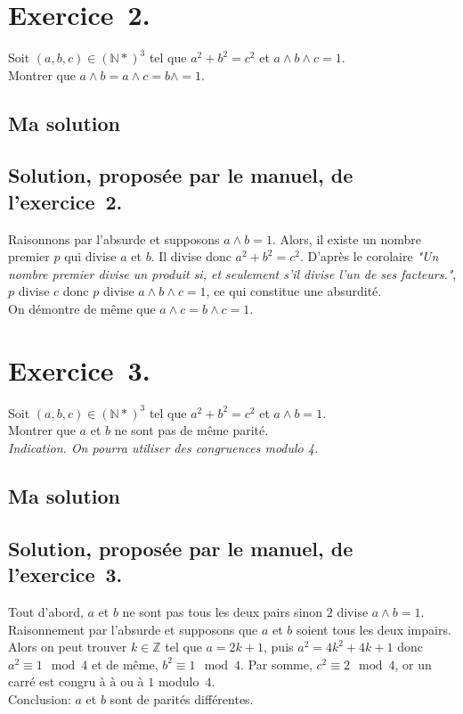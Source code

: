 \documentclass[a4paper,14pt]{extarticle} %
\def\eclaire{\mathbb}
\def\N{\ensuremath{\eclaire N}}
\def\Z{\ensuremath{\eclaire Z}}
\begin{document}
\section*{Exercice~2.}

Soit $(a,b,c) \in (\N*)^3$ tel que $a^2+b^2=c^2$ et $ a \wedge b \wedge c =1$.\\ Montrer que $a \wedge b = a \wedge c = b \wedge =1$.

\subsection*{Ma solution}

\subsection*{Solution, proposée par le manuel, de l'exercice~2.}
Raisonnons par l'absurde et supposons $ a \wedge b =1$. Alors, il existe un nombre premier $p$ qui divise $a$ et $b$. Il divise donc $a^2+b^2=c^2$. D'après le corolaire {\textsl{"Un nombre premier divise un produit si, et seulement s'il divise l'un de ses facteurs."}}, $p$ divise $c$ donc $p$ divise $ a \wedge b \wedge c =1$, ce qui constitue une absurdité.\\
On démontre de même que $ a \wedge c = b \wedge c =1$.

\section*{Exercice~3.}

Soit $(a,b,c) \in (\N*)^3$ tel que $a^2+b^2=c^2$ et $ a \wedge b =1$.\\ Montrer que $a$ et $ b$ ne sont pas de même parité.\\
\textsl{Indication. On pourra utiliser des congruences modulo 4.}

\subsection*{Ma solution}


\subsection*{Solution, proposée par le manuel, de l'exercice~3.}
Tout d'abord, $a$ et $b$ ne sont pas tous les deux pairs sinon $2$ divise $ a \wedge b =1$. \\
Raisonnement par l'absurde et supposons que $a$ et $b$ soient tous les deux impairs. Alors on peut trouver $k \in \Z$ tel que $a=2k+1$, puis $a^2 =4k^2+4k+1$ donc $a^2 \equiv 1 \mod{4}$ et de même, $b^2 \equiv 1 \mod{4}$. Par somme, $c^2 \equiv 2 \mod{4}$, or un carré est congru à $à$ ou à $1$ modulo~$4$. \\ 
Conclusion: $a$ et $b$ sont de parités différentes.
\end{document}
